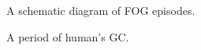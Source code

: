 \documentclass[10pt,twocolumn,letterpaper]{article}
\begin{document}
\begin{figure}[t]
    \centering
    \caption{A schematic diagram of FOG episodes.}
    \label{fig:f1}
\end{figure}

\begin{figure}[t]
    \centering
    \caption{A period of human's GC.}
    \label{fig:f2}
\end{figure}
\end{document}
